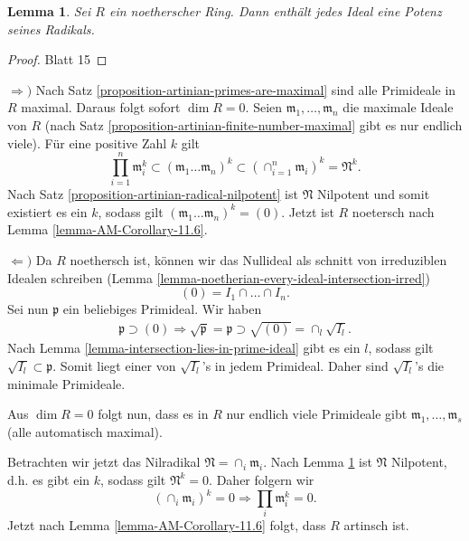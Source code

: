\documentclass[reqno,12pt]{article}
\numberwithin{equation}{section}
\theoremstyle{plain}
\newtheorem{lemma}[thm]{Lemma}
\theoremstyle{definition}
\begin{document}
\begin{lemma}\label{lemma:noetherien-ideal-power-radical}
Sei $R$ ein noetherscher Ring. Dann enthält jedes Ideal eine Potenz seines Radikals.
\end{lemma}

\begin{proof}
Blatt 15
\end{proof}

\bigskip


$\Rightarrow)$ Nach Satz \ref{proposition-artinian-primes-are-maximal} sind alle Primideale in $R$ maximal. Daraus folgt sofort $\dim R = 0$. Seien $\mathfrak{m}_1 , \dots , \mathfrak{m}_n$ die maximale Ideale von $R$ (nach Satz \ref{proposition-artinian-finite-number-maximal} gibt es nur endlich viele). Für eine positive Zahl $k$ gilt
$$
\prod_{i=1}^n \mathfrak{m}_i^k \subset (\mathfrak{m}_1  \dots  \mathfrak{m}_n)^k \subset (\cap_{i=1}^n  \mathfrak{m}_i)^k = \mathfrak{N}^k.
$$
Nach Satz \ref{proposition-artinian-radical-nilpotent} ist $\mathfrak{N}$ Nilpotent und somit existiert es ein $k$, sodass gilt $(\mathfrak{m}_1  \dots  \mathfrak{m}_n)^k=(0)$. Jetzt ist $R$ noetersch nach Lemma \ref{lemma-AM-Corollary-11.6}.

\smallskip

$\Leftarrow)$ Da $R$ noethersch ist, können wir das Nullideal als schnitt von irreduziblen Idealen schreiben (Lemma \ref{lemma-noetherian-every-ideal-intersection-irred})
$$
(0) = I_1 \cap \dots \cap I_n.
$$
Sei nun $\mathfrak{p}$ ein beliebiges Primideal. Wir haben
\begin{align*}
\mathfrak{p} \supset (0) \Rightarrow \sqrt{\mathfrak{p}} = \mathfrak{p} \supset \sqrt{(0)} = \cap_l \sqrt{I_l}.
\end{align*}
Nach Lemma \ref{lemma-intersection-lies-in-prime-ideal} gibt es ein $l$, sodass gilt $\sqrt{I_l} \subset \mathfrak{p}$. Somit liegt einer von $\sqrt{I_l}$'s in jedem Primideal. Daher sind $\sqrt{I_l}$'s die minimale Primideale.

Aus $\dim R = 0$ folgt nun, dass es in $R$ nur endlich viele Primideale gibt $\mathfrak{m}_1, \dots, \mathfrak{m}_s$  (alle automatisch maximal).

Betrachten wir jetzt das Nilradikal $\mathfrak{N} = \cap_i \mathfrak{m}_i$. Nach Lemma \ref{lemma:noetherien-ideal-power-radical} ist $\mathfrak{N}$ Nilpotent, d.h. es gibt ein $k$, sodass gilt $\mathfrak{N}^k=0$. Daher folgern wir
$$
(\cap_i \mathfrak{m}_i)^k = 0 \Rightarrow \prod_i  \mathfrak{m}_i^k = 0.
$$
Jetzt nach Lemma \ref{lemma-AM-Corollary-11.6} folgt, dass $R$ artinsch ist.
\end{document}
